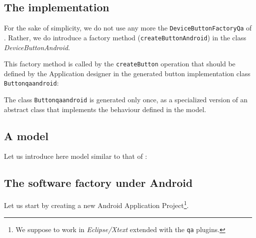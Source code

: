 \subsection{The implementation}

For the sake of simplicity, we do not use  any more the \texttt{DeviceButtonFactoryQa} of . Rather, we do introduce a factory method (\texttt{createButtonAndroid}) in the class \textit{DeviceButtonAndroid}. 



This factory method is called by the \texttt{createButton} operation that should be defined by the Application designer in the generated button implementation class \texttt{Buttonqaandroid}:



The class \texttt{Buttonqaandroid} is generated only once, as a specialized version of an abstract class that implements the behaviour defined in the model.

\subsection{A model}
Let us introduce here model similar to that of :



\bigskip 
\subsection{The software factory under Android}

Let us start by creating a new Android Application Project\footnote{We suppose to work in \textit{Eclipse/Xtext} extended with the \texttt{qa} plugins.}. 

